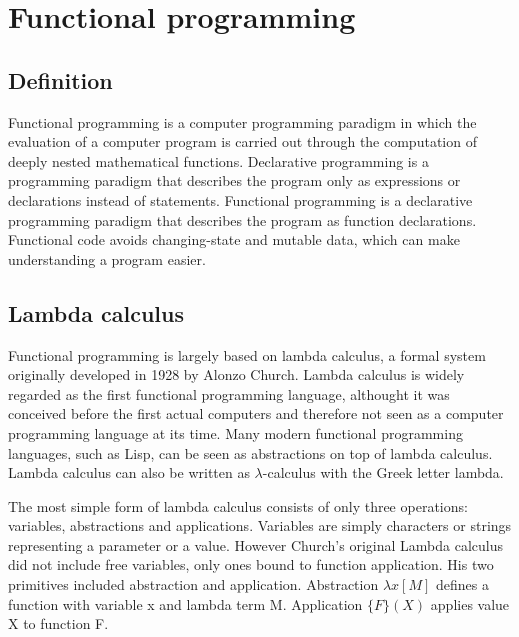 \chapter{Functional programming} \label{Functional programming}


\section{Definition}
Functional programming is a computer programming paradigm in which the evaluation of a computer program is carried out
through the computation of deeply nested mathematical functions. Declarative programming is a programming paradigm that
describes the program only as expressions or declarations instead of statements. Functional programming is a declarative
programming paradigm that describes the program as function declarations. Functional code avoids changing-state and
mutable data, which can make understanding a program easier.\cite{hudak}

\section{Lambda calculus}
Functional programming is largely based on lambda calculus, a formal system originally developed in 1928 by Alonzo
Church. Lambda calculus is widely regarded as the first functional programming language, althought it was conceived
before the first actual computers and therefore not seen as a computer programming language at its time. Many modern
functional programming languages, such as Lisp, can be seen as abstractions on top of lambda calculus. Lambda calculus
can also be written as $\lambda$-calculus with the Greek letter lambda.\cite{hudak}

The most simple form of lambda calculus consists of only three operations: variables, abstractions and applications.
Variables are simply characters or strings representing a parameter or a value. However Church's original Lambda
calculus did not include free variables, only ones bound to function application. His two primitives included
abstraction and application. Abstraction $\lambda x [ M ] $ defines a function with variable x and lambda term M.
Application $ \{ F \} ( X ) $ applies value X to function F.\cite{lambdacalculus}



